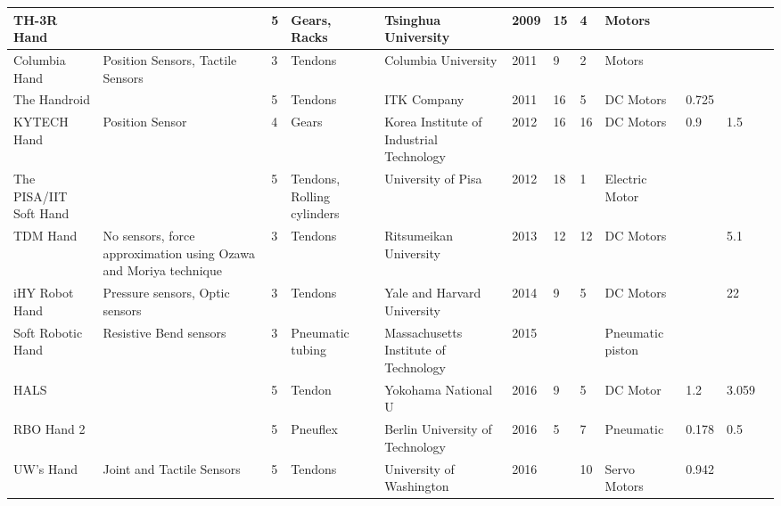 \documentclass[a4paper, 10pt, conference]{ieeeconf}      %
\begin{document}
\begin{landscape}
\begin{table}[]
\begin{tabular}{p{2cm}p{4cm}lp{2cm}p{2cm}lllp{2cm}lll}
TH-3R Hand &  & 5 & Gears, Racks & Tsinghua University & 2009 & 15 & 4 & Motors &  &  &  \\ \hline
Columbia Hand & Position Sensors, Tactile Sensors & 3 & Tendons & Columbia University & 2011 & 9 & 2 & Motors &  &  &  \\ \hline
The Handroid &  & 5 & Tendons & ITK Company & 2011 & 16 & 5 & DC Motors & 0.725 &  &  \\ \hline
KYTECH Hand & Position Sensor & 4 & Gears & Korea Institute of Industrial Technology & 2012 & 16 & 16 & DC Motors & 0.9 & 1.5 &  \\ \hline
The PISA/IIT Soft Hand &  & 5 & Tendons, Rolling cylinders & University of Pisa & 2012 & 18 & 1 & Electric Motor &  &  &  \\ \hline
TDM Hand & No sensors, force approximation using Ozawa and Moriya technique & 3 & Tendons & Ritsumeikan University & 2013 & 12 & 12 & DC Motors &  & 5.1 &  \\ \hline
iHY Robot Hand & Pressure sensors, Optic sensors & 3 & Tendons & Yale and Harvard University & 2014 & 9 & 5 & DC Motors &  & 22 &  \\ \hline
Soft Robotic Hand & Resistive Bend sensors & 3 & Pneumatic tubing & Massachusetts Institute of Technology & 2015 &  &  & Pneumatic piston &  &  &  \\ \hline
HALS &  & 5 & Tendon & Yokohama National U & 2016 & 9 & 5 & DC Motor & 1.2 & 3.059 &  \\ \hline
RBO Hand 2 &  & 5 & Pneuflex & Berlin University of Technology & 2016 & 5 & 7 & Pneumatic & 0.178 & 0.5 &  \\ \hline
UW’s Hand & Joint and Tactile Sensors & 5 & Tendons & University of Washington & 2016 &  & 10 & Servo Motors & 0.942 &  &  \\ \hline
\end{tabular}
\end{table}
\end{landscape}

\listoffigures


\nocite{*}

%
\end{document}
